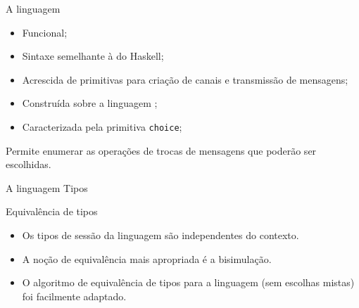 \lstset{language=freest, numbers=none, escapeinside=||}

\begin{frame}[fragile]{A linguagem \mixedchoice}
  \begin{itemize}
  \item Funcional;\pause
  \item Sintaxe semelhante à do Haskell;\pause
  \item Acrescida de primitivas para criação de canais e transmissão de mensagens;\pause
  \item Construída sobre a linguagem \freest;\pause
  \item Caracterizada pela primitiva \lstinline|choice|;\pause
  \end{itemize}

  \begin{tcolorbox}
Permite enumerar as operações de trocas de mensagens que poderão ser escolhidas.
\end{tcolorbox}
\end{frame}

\begin{frame}[fragile]{A linguagem \mixedchoice  \hfill \color{mLightBrown}Tipos}
  
\end{frame}

\begin{frame}[fragile]{Equivalência de tipos}
  \begin{itemize}
  \item Os tipos de sessão da linguagem \mixedchoice{} são independentes do contexto.
    \pause
  \item A noção de equivalência mais apropriada é a bisimulação.
    \pause
  \item O algoritmo de equivalência de tipos para a linguagem \freest{} (sem escolhas mistas) foi facilmente adaptado.
\end{itemize}
\end{frame}

